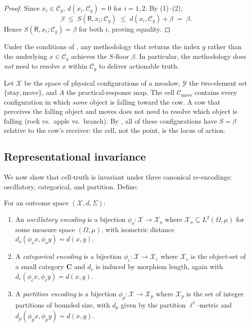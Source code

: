 \documentclass[twocolumn,11pt,a4paper]{article}
\newcommand{\X}{\mathcal{X}}
\newcommand{\Y}{\mathcal{Y}}
\newcommand{\Cell}{\mathcal{C}}
\newcommand{\receiver}{\mathsf{R}}
\begin{document}
\begin{proof}
Since $x_i\in\Cell_y$, $d(x_i,\Cell_y)=0$ for $i=1,2$. By
(1)--(2),
\[
\beta\;\le\;S(\receiver,x_i;\Cell_y)\;\le\;d(x_i,\Cell_y)+\beta\;=\;\beta.
\]
Hence $S(\receiver,x_i;\Cell_y)=\beta$ for both $i$, proving equality.
\end{proof}

\begin{corollary}
\label{cor:indist}
Under the conditions of , any methodology that returns
the index $y$ rather than the underlying $x\in\Cell_y$ achieves the
$S$-floor $\beta$. In particular, the methodology does \emph{not} need to
resolve $x$ within $\Cell_y$ to deliver actionable truth.
\end{corollary}

\begin{example}\label{ex:cow}
Let $\X$ be the space of physical configurations of a meadow, $\Y$ the
two-element set $\{\text{stay},\text{move}\}$, and $A$ the practical-response
map. The cell $\Cell_{\text{move}}$ contains every configuration in which
\emph{some} object is falling toward the cow. A cow that perceives the
falling object and moves does not need to resolve which object is falling
(rock vs.\ apple vs.\ branch). By , all of these
configurations have $S=\beta$ relative to the cow's receiver: the cell, not
the point, is the locus of action.
\end{example}

\subsection{Representational invariance}

We now show that cell-truth is invariant under three canonical
re-encodings: oscillatory, categorical, and partition. Define:

\begin{definition}\label{def:encodings}
For an outcome space $(\X,d,\Sigma)$:
\begin{enumerate}[label=(\alph*),leftmargin=*]
\item An \emph{oscillatory encoding} is a bijection
$\phi_o:\X\to\X_o$ where $\X_o\subseteq L^2(\Omega,\mu)$ for some measure
space $(\Omega,\mu)$, with isometric distance $d_o(\phi_o x,\phi_o
y)=d(x,y)$.
\item A \emph{categorical encoding} is a bijection
$\phi_c:\X\to\X_c$ where $\X_c$ is the object-set of a small category
$\mathbf{C}$ and $d_c$ is induced by morphism length, again with
$d_c(\phi_c x,\phi_c y)=d(x,y)$.
\item A \emph{partition encoding} is a bijection
$\phi_p:\X\to\X_p$ where $\X_p$ is the set of integer partitions of bounded
size, with $d_p$ given by the partition $\ell^1$-metric and
$d_p(\phi_p x,\phi_p y)=d(x,y)$.
\end{enumerate}
\end{definition}
\end{document}
